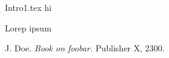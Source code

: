 \documentclass{ctuthesis}
\begin{document}
\maketitle
{Intro1.tex}
hi



Lorep ipsum \cite{doe}



\begin{thebibliography}{1}
 J. Doe. \emph{Book on foobar.} Publisher X,
2300.
\end{thebibliography}
\end{document}
